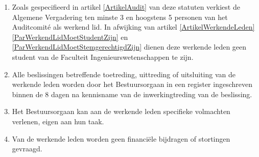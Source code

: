 \begin{enumerate}
    \item Zoals gespecifieerd in artikel \ref{ArtikelAudit} van deze statuten verkiest de Algemene Vergadering ten minste 3 en hoogstens 5 personen van het Auditcomité als werkend lid. In afwijking van artikel \ref{ArtikelWerkendeLeden} \ref{ParWerkendLidMoetStudentZijn} en \ref{ParWerkendLidMoetStemgerechtigdZijn} dienen deze werkende leden geen student van de Faculteit Ingenieurswetenschappen te zijn.
    \item Alle beslissingen betreffende toetreding, uittreding of uitsluiting van de werkende leden worden door het Bestuursorgaan in een register ingeschreven binnen de 8 dagen na kennisname van de inwerkingtreding van de beslissing.
    \item Het Bestuursorgaan kan aan de werkende leden specifieke volmachten verlenen, eigen aan hun taak.
    \item Van de werkende leden worden geen financiële bijdragen of stortingen gevraagd.
    \end{enumerate}
    
